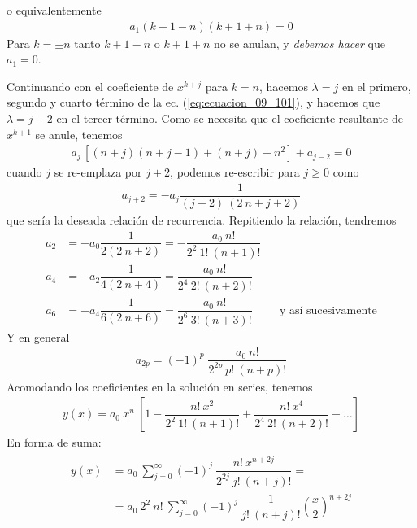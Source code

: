 o equivalentemente
\begin{align}
a_{1} (k + 1 - n)(k + 1 + n) = 0
\label{eq:ecuacion_09_104}
\end{align}
Para $k = \pm n$ tanto $k + 1 -n$ o $k + 1 + n$ no se anulan, y \emph{debemos hacer} que $a_{1} = 0$.
\par
Continuando con el coeficiente de $x^{k+j}$ para $k=n$, hacemos $\lambda=j$ en el primero, segundo y cuarto término de la ec. (\ref{eq:ecuacion_09_101}), y hacemos que $\lambda = j - 2$ en el tercer término. Como se necesita que el coeficiente resultante de $x^{k+1}$ se anule, tenemos
\begin{align*}
a_{j} \, [(n + j)(n + j - 1) + (n + j) - n^{2}] + a_{j-2} = 0
\end{align*}
cuando $j$ se re-emplaza por $j+2$, podemos re-escribir para $j \geq 0$ como
\begin{align}
a_{j+2} = - a_{j} \dfrac{1}{(j + 2) \: (2 \: n + j + 2)}
\label{eq:ecuacion_09_105}
\end{align}
que sería la deseada relación de recurrencia. Repitiendo la relación, tendremos
\begin{align*}
a_{2} &= - a_{0} \dfrac{1}{2(2 \: n + 2)} = - \dfrac{a_{0} \: n!}{2^{2} \: 1! \: (n + 1)!} \\[0.5em]
a_{4} &= - a_{2} \dfrac{1}{4(2 \: n + 4)} =  \dfrac{a_{0} \: n!}{2^{4} \: 2! \: (n + 2)!} \\[0.5em]
a_{6} &= - a_{4} \dfrac{1}{6(2 \: n + 6)} =  \dfrac{a_{0} \: n!}{2^{6} \: 3! \: (n + 3)!} \hspace{1cm}\mbox{y así sucesivamente}
\end{align*}
Y en general
\begin{align}
a_{2 p} = (- 1)^{p} \; \dfrac{a_{0} \: n!}{2^{2p} \: p! \: (n+p)!}
\label{eq:ecuacion_09_106}
\end{align}
Acomodando los coeficientes en la solución en series, tenemos
\begin{align}
y(x) = a_{0} \: x^{n} \: \left[ 1 - \dfrac{n! \: x^{2}}{2^{2} \: 1! \: (n + 1)!} + \dfrac{n! \: x^{4}}{2^{4} \: 2! \: (n+2)!} - \ldots \right]
\label{eq:ecuacion_09_107}
\end{align}
En forma de suma:
\begin{align}
\begin{aligned} 
y(x) &= a_{0}\: \sum_{j=0}^{\infty} (-1)^{j} \: \dfrac{n! \:  x^{n + 2j}}{2^{2j} \: j! \: (n+j)!} = \\
&= a_{0} \: 2^{2} \: n! \: \sum_{j=0}^{\infty} (-1)^{j} \: \dfrac{1}{j! \: (n+j)!} \left( \dfrac{x}{2} \right)^{n + 2j}
\end{aligned}	
\label{eq:ecuacion_09_108}  
\end{align}
